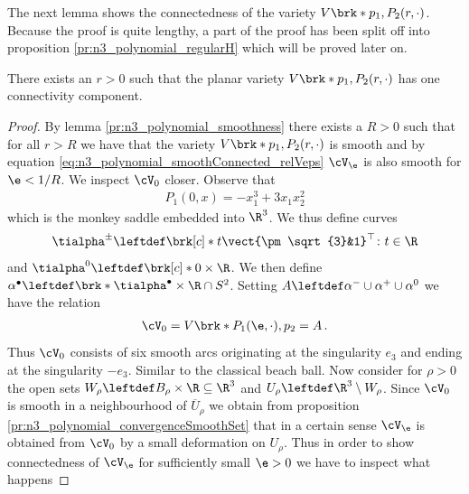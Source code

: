 The next lemma shows the connectedness of the variety $V\brk*{p_1,P_2(r,\cdot)}$.
Because the proof is quite lengthy, a part of the proof has been split off into
proposition \ref{pr:n3_polynomial_regularH} which will be proved later on.
%   

\begin{lemma}[Connectedness]\label{pr:n3_polynomial_smoothConnected}
  There exists an $r>0$ such that the planar variety $V\brk*{p_1,P_2(r,\cdot)}$
  has one connectivity component.
\end{lemma}
\begin{proof}
  By lemma \ref{pr:n3_polynomial_smoothness} there exists a $R>0$ such that for all $r>R$ we have that the
  variety $V\brk*{p_1,P_2(r,\cdot)}$ is smooth and by equation \eqref{eq:n3_polynomial_smoothConnected_relVeps}
  $\cV_\e$ is also smooth for $\e<1/R$.
  We inspect $\cV_0$ closer.
  Observe that
  \begin{align*}
    P_1(0,x)=-x_1^3+3x_1x_2^2
  \end{align*}
  which is the monkey saddle embedded into $\R^3$. We thus define curves
  \begin{align*}
    \tialpha^\pm\leftdef\brk[c]*{t\vect{\pm\sqrt{3}&1}^\top \colon t\in\R}
  \end{align*}
  and $\tialpha^0\leftdef\brk[c]*{0}\times\R$.
  We then define $\alpha^\bullet\leftdef\brk*{\tialpha^\bullet\times\R}\cap S^2$.
  Setting $A\leftdef\alpha^-\cup\alpha^+\cup\alpha^0$
  we have the relation
  \begin{align*}
    \cV_0=V\brk*{P_1(\e,\cdot),p_2}
    =A\,.
  \end{align*}
  Thus $\cV_0$ consists of six smooth arcs originating at the singularity $e_3$ and
  ending at the singularity $-e_3$. Similar to the classical beach ball.
  Now consider for $\rho>0$ the open sets $W_\rho\leftdef B_\rho\times\R\subseteq\R^3$ and $U_\rho\leftdef\R^3\setminus W_\rho$.
  Since $\cV_0$ is smooth in a neighbourhood of $\overline{U}_\rho$ we obtain from proposition \ref{pr:n3_polynomial_convergenceSmoothSet}
  that in a certain sense $\cV_\e$ is obtained from $\cV_0$ by a small deformation on $U_\rho$.
  Thus in order to show connectedness of $\cV_\e$ for sufficiently small $\e>0$ we have to inspect what happens

\end{proof}

